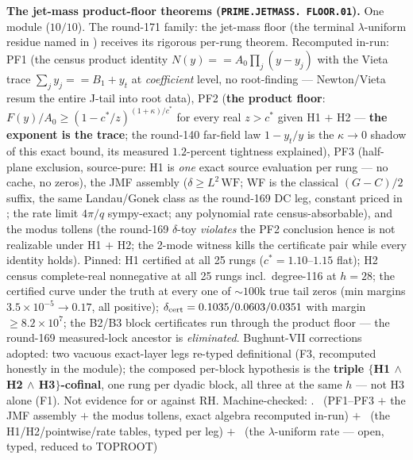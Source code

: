 \documentclass[11pt,a4paper]{article}
\theoremstyle{definition}
\begin{document}
\par\smallskip\noindent\textbf{The jet-mass product-floor
theorems (\texttt{PRIME.\allowbreak JETMASS.\allowbreak
FLOOR.01}).}
One module ($10/10$).  The round-171 family: the jet-mass floor
(the terminal $\lambda$-uniform residue named in
) receives its rigorous
per-rung theorem.  Recomputed in-run: PF1 (the census product
identity $N(y) == A_0 \prod_j (y - y_j)$ with the Vieta trace
$\sum_j y_j == B_1 + y_t$ at \emph{coefficient} level, no
root-finding --- Newton/Vieta resum the entire J-tail into root
data), PF2 (\textbf{the product floor}: $F(y)/A_0 \ge
(1 - c^*/z)^{(1 + \kappa)/c^*}$ for every real $z > c^*$ given
H1 $+$ H2 --- \textbf{the exponent is the trace}; the round-140
far-field law $1 - y_t/y$ is the $\kappa \to 0$ shadow of this
exact bound, its measured $1.2$-percent tightness explained),
PF3 (half-plane exclusion, source-pure: H1 is \emph{one} exact
source evaluation per rung --- no cache, no zeros), the JMF
assembly ($\delta \ge L^2\,\mathrm{WF}$; WF is the classical
$(G - C)/2$ suffix, the same Landau/Gonek class as the round-169
DC leg, constant priced in
; the rate limit
$4\pi/q$ sympy-exact; any polynomial rate census-absorbable),
and the modus tollens (the round-169 $\delta$-toy \emph{violates}
the PF2 conclusion hence is not realizable under H1 $+$ H2; the
2-mode witness kills the certificate pair while every identity
holds).  Pinned: H1 certified at all 25 rungs ($c^* =
1.10$--$1.15$ flat); H2 census complete-real nonnegative at all
25 rungs incl.\ degree-116 at $h = 28$; the certified curve
under the truth at every one of ${\sim}100$k true tail zeros
(min margins $3.5\times10^{-5} \to 0.17$, all positive);
$\delta_{\rm cert} = 0.1035/0.0603/0.0351$ with margin $\ge
8.2\times10^{7}$; the B2/B3 block certificates run through the
product floor --- the round-169 measured-lock ancestor is
\emph{eliminated}.  Bughunt-VII corrections adopted: two vacuous
exact-layer legs re-typed definitional (F3, recomputed honestly
in the module); the composed per-block hypothesis is the
\textbf{triple $\{$H1 $\wedge$ H2 $\wedge$ H3$\}$-cofinal}, one
rung per dyadic block, all three at the same $h$ --- not H3
alone (F1).  Not evidence for or against RH.
Machine-checked: .
\mE\ (PF1--PF3 $+$ the JMF assembly $+$ the modus tollens, exact
algebra recomputed in-run) $+$ \mC\ (the H1/H2/pointwise/rate
tables, typed per leg) $+$ \mO\ (the $\lambda$-uniform rate ---
open, typed, reduced to TOPROOT)
\par\smallskip
\end{document}
